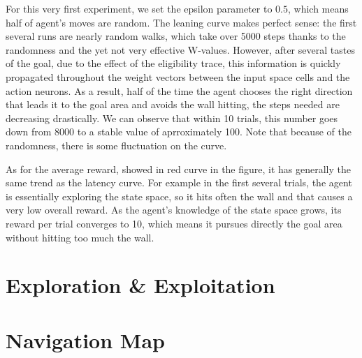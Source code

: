 \documentclass[a4paper, 12pt]{article}
\begin{document}
For this very first experiment, we set the epsilon parameter to $0.5$,
which means half of agent's moves are random. The leaning curve makes
perfect sense: the first several runs are nearly random walks, which
take over 5000 steps thanks to the randomness and the yet not very
effective W-values. However, after several tastes of the goal, due to
the effect of the eligibility trace, this information is quickly
propagated throughout the weight vectors between the input space cells
and the action neurons. As a result, half of the time the agent
chooses the right direction that leads it to the goal area and avoids
the wall hitting, the steps needed are decreasing drastically. We can
observe that within 10 trials, this number goes down from 8000 to
a stable value of aprroximately 100. Note that because of the
randomness, there is some fluctuation on the curve.

As for the average reward, showed in red curve in the figure, it has
generally the same trend as the latency curve. For example in the
first several trials, the agent is essentially exploring the state
space, so it hits often the wall and that causes a very low overall
reward. As the agent's knowledge of the state space grows, its reward
per trial converges to 10, which means it pursues directly the goal
area without hitting too much the wall.

\section{Exploration \& Exploitation}

\section{Navigation Map}
\end{document}
